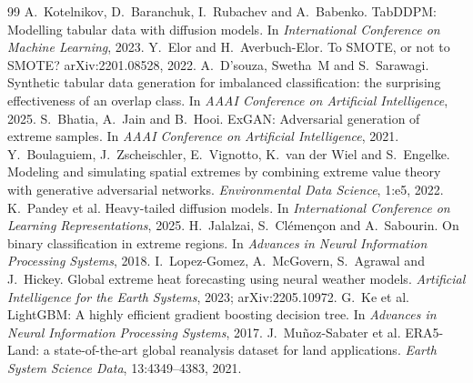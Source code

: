 \documentclass[11pt,a4paper]{article}
\begin{document}
\begin{thebibliography}{99}
 A.~Kotelnikov, D.~Baranchuk, I.~Rubachev and A.~Babenko. TabDDPM: Modelling tabular
  data with diffusion models. In \textit{International Conference on Machine Learning}, 2023.
 Y.~Elor and H.~Averbuch-Elor. To SMOTE, or not to SMOTE? arXiv:2201.08528, 2022.
 A.~D'souza, Swetha~M and S.~Sarawagi. Synthetic tabular data generation for imbalanced
  classification: the surprising effectiveness of an overlap class. In \textit{AAAI Conference on Artificial
  Intelligence}, 2025.
 S.~Bhatia, A.~Jain and B.~Hooi. ExGAN: Adversarial generation of extreme samples. In
  \textit{AAAI Conference on Artificial Intelligence}, 2021.
 Y.~Boulaguiem, J.~Zscheischler, E.~Vignotto, K.~van der Wiel and S.~Engelke. Modeling
  and simulating spatial extremes by combining extreme value theory with generative adversarial networks.
  \textit{Environmental Data Science}, 1:e5, 2022.
 K.~Pandey et al. Heavy-tailed diffusion models. In \textit{International Conference on
  Learning Representations}, 2025.
 H.~Jalalzai, S.~Cl\'emen\c{c}on and A.~Sabourin. On binary classification in extreme
  regions. In \textit{Advances in Neural Information Processing Systems}, 2018.
 I.~Lopez-Gomez, A.~McGovern, S.~Agrawal and J.~Hickey. Global extreme heat forecasting
  using neural weather models. \textit{Artificial Intelligence for the Earth Systems}, 2023; arXiv:2205.10972.
 G.~Ke et al. LightGBM: A highly efficient gradient boosting decision tree. In
  \textit{Advances in Neural Information Processing Systems}, 2017.
 J.~Mu\~noz-Sabater et al. ERA5-Land: a state-of-the-art global reanalysis dataset for
  land applications. \textit{Earth System Science Data}, 13:4349--4383, 2021.
\end{thebibliography}
\end{document}
